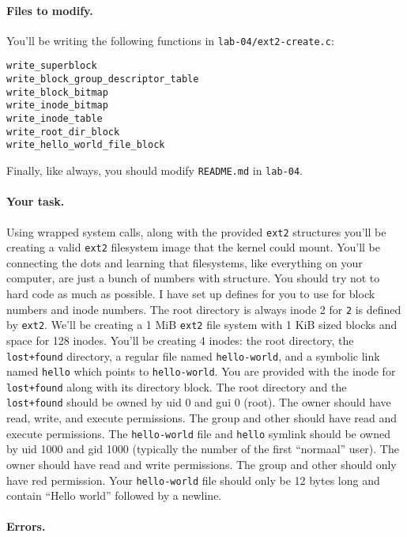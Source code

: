 \paragraph{Files to modify.}

You'll be writing the following functions in \texttt{lab-04/ext2-create.c}:

\begin{lstlisting}
write_superblock
write_block_group_descriptor_table
write_block_bitmap
write_inode_bitmap
write_inode_table
write_root_dir_block
write_hello_world_file_block
\end{lstlisting}

Finally, like always, you should modify \texttt{README.md} in \texttt{lab-04}.

\paragraph{Your task.}

Using wrapped system calls, along with the provided \texttt{ext2} structures
you'll be creating a valid \texttt{ext2} filesystem image that the kernel
could mount.
You'll be connecting the dots and learning that filesystems, like everything
on your computer, are just a bunch of numbers with structure.
You should try not to hard code as much as possible.
I have set up defines for you to use for block numbers and inode numbers.
The root directory is always inode 2 for \texttt{2} is defined by \texttt{ext2}.
We'll be creating a 1 MiB \texttt{ext2} file system with 1 KiB sized blocks
and space for 128 inodes.
You'll be creating 4 inodes: the root directory, the \lstinline|lost+found|
directory, a regular file named \texttt{hello-world}, and a symbolic link
named \texttt{hello} which points to \texttt{hello-world}.
You are provided with the inode for \lstinline|lost+found| along with its
directory block.
The root directory and the \lstinline|lost+found| should be owned by uid 0
and gui 0 (root).
The owner should have read, write, and execute permissions.
The group and other should have read and execute permissions.
The \lstinline|hello-world| file and \lstinline|hello| symlink should be
owned by uid 1000 and gid 1000 (typically the number of the first ``normaal''
user).
The owner should have read and write permissions.
The group and other should only have red permission.
Your \lstinline|hello-world| file should only be 12 bytes long and contain
``Hello world'' followed by a newline.

\paragraph{Errors.}

